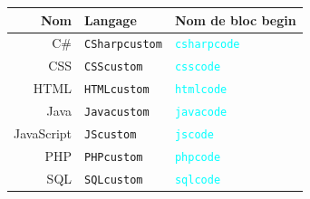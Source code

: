 \begin{table}[H]
	\centering

	\begin{tabular}{|r|l|l|}
		\hline
		\textbf{Nom}     &
		\textbf{Langage} &
		\textbf{Nom de bloc begin}            \\
		\hline

		C\#              &
		\texttt{CSharpcustom}     &
		\textcolor{cyan}{\texttt{csharpcode}} \\
		\hline

		CSS              &
		\texttt{CSScustom}        &
		\textcolor{cyan}{\texttt{csscode}}    \\
		\hline

		HTML             &
		\texttt{HTMLcustom}       &
		\textcolor{cyan}{\texttt{htmlcode}}   \\
		\hline

		Java             &
		\texttt{Javacustom}       &
		\textcolor{cyan}{\texttt{javacode}}   \\
		\hline

		JavaScript       &
		\texttt{JScustom}         &
		\textcolor{cyan}{\texttt{jscode}}     \\
		\hline

		PHP              &
		\texttt{PHPcustom}        &
		\textcolor{cyan}{\texttt{phpcode}}    \\
		\hline

		SQL              &
		\texttt{SQLcustom}        &
		\textcolor{cyan}{\texttt{sqlcode}}    \\
		\hline
	\end{tabular}
	\label{tab:tests}
\end{table}

